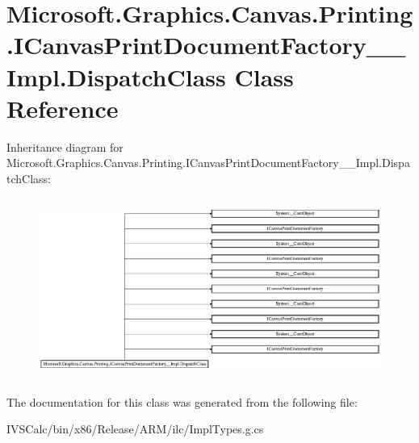\hypertarget{class_microsoft_1_1_graphics_1_1_canvas_1_1_printing_1_1_i_canvas_print_document_factory_____impl_1_1_dispatch_class}{}\section{Microsoft.\+Graphics.\+Canvas.\+Printing.\+I\+Canvas\+Print\+Document\+Factory\+\_\+\+\_\+\+Impl.\+Dispatch\+Class Class Reference}
\label{class_microsoft_1_1_graphics_1_1_canvas_1_1_printing_1_1_i_canvas_print_document_factory_____impl_1_1_dispatch_class}
Inheritance diagram for Microsoft.\+Graphics.\+Canvas.\+Printing.\+I\+Canvas\+Print\+Document\+Factory\+\_\+\+\_\+\+Impl.\+Dispatch\+Class\+:\begin{figure}[H]
\begin{center}
\leavevmode
\includegraphics[height=5.945946cm]{class_microsoft_1_1_graphics_1_1_canvas_1_1_printing_1_1_i_canvas_print_document_factory_____impl_1_1_dispatch_class}
\end{center}
\end{figure}


The documentation for this class was generated from the following file\+:\begin{DoxyCompactItemize}
\item 
I\+V\+S\+Calc/bin/x86/\+Release/\+A\+R\+M/ilc/Impl\+Types.\+g.\+cs\end{DoxyCompactItemize}
